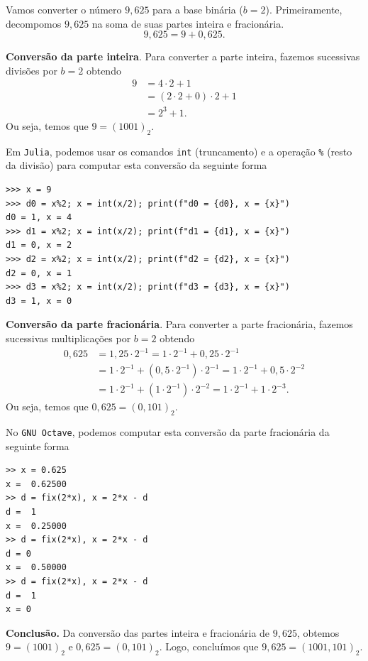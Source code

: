 \begin{ex}
  Vamos converter o número $9,625$ para a base binária ($b=2$). Primeiramente, decompomos $9,625$ na soma de suas partes inteira e fracionária.
  \begin{equation}
    9,625 = 9 + 0,625.
  \end{equation}

{\bf Conversão da parte inteira}. Para converter a parte inteira, fazemos sucessivas divisões por $b=2$ obtendo
\begin{align}
  9 &= 4\cdot 2 + 1\\
  &= (2\cdot 2 + 0)\cdot 2 + 1\\
  &= 2^3 + 1.
\end{align}
Ou seja, temos que $9 = (1001)_2$.


Em \verb+Julia+, podemos usar os comandos \verb+int+ (truncamento) e a operação \verb+%+ (resto da divisão) para computar esta conversão da seguinte forma
\begin{lstlisting}
>>> x = 9
>>> d0 = x%2; x = int(x/2); print(f"d0 = {d0}, x = {x}")
d0 = 1, x = 4
>>> d1 = x%2; x = int(x/2); print(f"d1 = {d1}, x = {x}")
d1 = 0, x = 2
>>> d2 = x%2; x = int(x/2); print(f"d2 = {d2}, x = {x}")
d2 = 0, x = 1
>>> d3 = x%2; x = int(x/2); print(f"d3 = {d3}, x = {x}")
d3 = 1, x = 0
\end{lstlisting}

{\bf Conversão da parte fracionária}. Para converter a parte fracionária, fazemos sucessivas multiplicações por $b=2$ obtendo
\begin{align}
  0,625 &= 1,25\cdot 2^{-1} = 1\cdot 2^{-1} + 0,25\cdot 2^{-1}\\
  &= 1\cdot 2^{-1} + (0,5\cdot 2^{-1})\cdot 2^{-1} = 1\cdot 2^{-1} + 0,5\cdot 2^{-2}\\
  &= 1\cdot 2^{-1} + (1\cdot 2^{-1})\cdot 2^{-2} = 1\cdot 2^{-1} + 1\cdot 2^{-3}.
\end{align}
Ou seja, temos que $0,625 = (0,101)_2$.

No \verb+GNU Octave+, podemos computar esta conversão da parte fracionária da seguinte forma
\begin{verbatim}
>> x = 0.625
x =  0.62500
>> d = fix(2*x), x = 2*x - d
d =  1
x =  0.25000
>> d = fix(2*x), x = 2*x - d
d = 0
x =  0.50000
>> d = fix(2*x), x = 2*x - d
d =  1
x = 0
\end{verbatim}

{\bf Conclusão.} Da conversão das partes inteira e fracionária de $9,625$, obtemos $9 = (1001)_2$ e $0,625 = (0,101)_2$. Logo, concluímos que $9,625 = (1001,101)_2$.
\end{ex}

